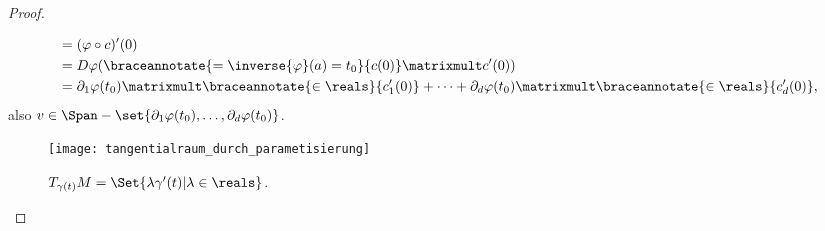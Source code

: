 \begin{proof}
\begin{proofdescription}
\begin{align*}
      &=(\varphi\circ c)'(0)\\
      &=D\varphi(\braceannotate{=\inverse{\varphi}(a)=t_0}{c(0)}\matrixmult c'(0))\\
      &=\partial_1 \varphi(t_0)\matrixmult\braceannotate{\in \reals}{c_1'(0)}+\dotsb+\partial_d \varphi(t_0)\matrixmult\braceannotate{\in \reals}{c_d'(0)},
    \end{align*}
    also \( v\in \Span-{\set{\partial_1 \varphi(t_0),\dotsc,\partial_d\varphi(t_0)}} \).
  \end{proofdescription}
  \begin{figure}[H]
    \centering
    \texttt{[image: tangentialraum\_durch\_parametisierung]}
    \caption*{\( T_{\gamma(t)}M=\Set{\lambda\gamma'(t)|\lambda\in \reals} \).}
    \label{fig:tangentialraum_durch_parametisierung}
  \end{figure}
\end{proof}
